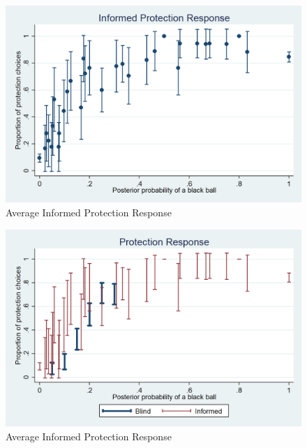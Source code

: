 \documentclass[11pt,a4paper]{article}
\begin{document}
\begin{figure}[H]
\centering
\caption{Average Informed Protection Response} \label{Informed Protection Responses}

  \centering
  \includegraphics[scale=0.3]{Graphs/ip_response.png}

\end{figure}

\begin{figure}[H]
\centering
\caption{Average Informed Protection Response} \label{Informed Protection Responses}

  \centering
  \includegraphics[scale=0.3]{Graphs/ip_response_comp.png}

\end{figure}
\end{document}
